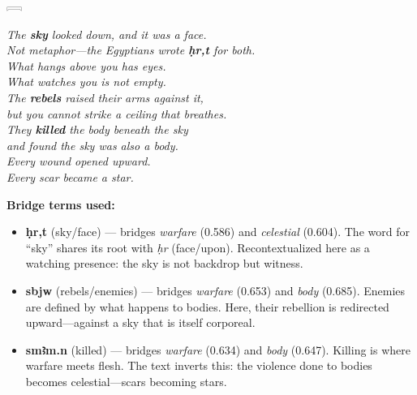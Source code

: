 \documentclass[11pt, a4paper]{article}
\newcommand{\hiero}[1]{{\normalfont\hierofont #1}}
\newcommand{\bighiero}[1]{{\normalfont\hierofont\fontsize{48}{56}\selectfont #1}}
\newcommand{\displayglyph}[1]{%
  \begin{center}
  \bighiero{#1}
  \end{center}
  \vspace{-6pt}
}
\newenvironment{bridgebox}[1][]{%
  \def\boxtitle{#1}%
  \begin{oframed}%
  \noindent{\bfseries\color{nile!90!black}\boxtitle}\par\smallskip%
}{%
  \end{oframed}%
}
\begin{document}
\begin{bridgebox}[Text I: The Face Above \hfill \hiero{𓇯𓁶}]

\displayglyph{𓇯}

\medskip
\begin{center}
\begin{minipage}{0.85\textwidth}
\itshape\large
The \textbf{\color{nile}sky} looked down, and it was a face.\\
Not metaphor---the Egyptians wrote \textbf{\color{nile}ḥr,t} for both.\\[6pt]
What hangs above you has eyes.\\
What watches you is not empty.\\
The \textbf{\color{nile}rebels} raised their arms against it,\\
but you cannot strike a ceiling that breathes.\\[6pt]
They \textbf{\color{nile}killed} the body beneath the sky\\
and found the sky was also a body.\\
Every wound opened upward.\\
Every scar became a star.
\end{minipage}
\end{center}

\medskip
\small
\noindent\textbf{Bridge terms used:}
\begin{itemize}[nosep, leftmargin=1.5em]
  \item \textbf{\color{nile}ḥr,t} (sky/face) --- bridges \textit{warfare} (0.586) and \textit{celestial} (0.604). The word for ``sky'' shares its root with \textit{ḥr} (face/upon). Recontextualized here as a watching presence: the sky is not backdrop but witness.
  \item \textbf{\color{nile}sbjw} (rebels/enemies) --- bridges \textit{warfare} (0.653) and \textit{body} (0.685). Enemies are defined by what happens to bodies. Here, their rebellion is redirected upward---against a sky that is itself corporeal.
  \item \textbf{\color{nile}smꜣm.n} (killed) --- bridges \textit{warfare} (0.634) and \textit{body} (0.647). Killing is where warfare meets flesh. The text inverts this: the violence done to bodies becomes celestial---scars becoming stars.
\end{itemize}
\end{bridgebox}

\bigskip
\end{document}

